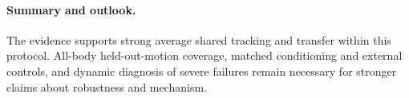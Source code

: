 \paragraph{Summary and outlook.}
The evidence supports strong average shared tracking and transfer within this
protocol. All-body held-out-motion coverage, matched conditioning and external
controls, and dynamic diagnosis of severe failures remain necessary for
stronger claims about robustness and mechanism.
